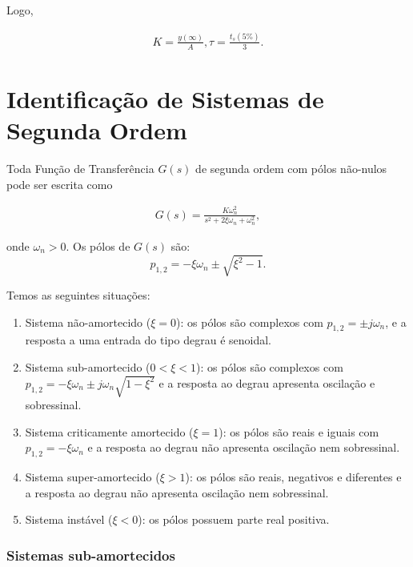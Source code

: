 \documentclass[
]{book}
\providecommand{\tightlist}{%
  \setlength{\itemsep}{0pt}\setlength{\parskip}{0pt}}
\theoremstyle{definition}
\theoremstyle{definition}
\theoremstyle{definition}
\theoremstyle{remark}
\begin{document}
Logo,

\begin{align}
K = \frac{y(\infty)}{A},  \tau = \frac {t_s(5\%)}{3}. \label{eq:eq32}
\end{align}

\hypertarget{identificauxe7uxe3o-de-sistemas-de-segunda-ordem}{%
\section{Identificação de Sistemas de Segunda Ordem}\label{identificauxe7uxe3o-de-sistemas-de-segunda-ordem}}

Toda Função de Transferência \(G(s)\) de segunda ordem com pólos não-nulos pode ser escrita como

\begin{align}
G(s) = \frac {K \omega_n^2}{s^2+2\xi \omega_n+ \omega_n^2}, \label{eq:eq33}
\end{align}

onde \(\omega_n > 0\). Os pólos de \(G(s)\) são:
\[
p_{1,2} = - \xi \omega_n \pm \sqrt{\xi^2 -1}.
\]

Temos as seguintes situações:

\begin{enumerate}
\def\labelenumi{\arabic{enumi}.}
\tightlist
\item
  Sistema não-amortecido (\(\xi = 0\)): os pólos são complexos com \(p_{1,2} = \pm j \omega_n\), e a resposta a uma entrada do tipo degrau é senoidal.
\item
  Sistema sub-amortecido (\(0< \xi <1\)): os pólos são complexos com \(p_{1,2} = - \xi \omega_n \pm j \omega_n\sqrt{1 - \xi^2}\) e a resposta ao degrau apresenta oscilação e sobressinal.
\item
  Sistema criticamente amortecido (\(\xi = 1\)): os pólos são reais e iguais com \(p_{1,2} = -\xi \omega_n\) e a resposta ao degrau não apresenta oscilação nem sobressinal.
\item
  Sistema super-amortecido (\(\xi >1\)): os pólos são reais, negativos e diferentes e a resposta ao degrau não apresenta oscilação nem sobressinal.
\item
  Sistema instável (\(\xi < 0\)): os pólos possuem parte real positiva.
\end{enumerate}

\hypertarget{sistemas-sub-amortecidos}{%
\subsubsection*{Sistemas sub-amortecidos}\label{sistemas-sub-amortecidos}}
\end{document}
